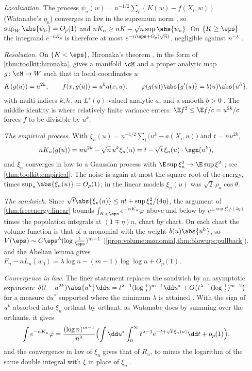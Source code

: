 \begin{refsection}
\begin{proofsketch}
\emph{Localization.} The process $\psi_n(w)=n^{-1/2}\sum_i(K(w)-f(X_i,w))$ (Watanabe's $\eta_n$) converges in law in the supremum norm \parencite[Theorems 5.9 and 5.10, as cited in][]{Watanabe2013}, so $\sup_W\abs{\psi_n}=O_p(1)$ and $nK_n\ge nK-\sqrt n\sup\abs{\psi_n}$. On $\{K\ge\eps\}$ the integrand $e^{-nK_n}$ is therefore at most $e^{-n\eps+O_p(\sqrt n)}$, negligible against $n^{-\lambda}$ \parencite[Lemma~1]{Watanabe2013}.

\emph{Resolution.} On $\{K<\eps\}$, Hironaka's theorem \parencite{Hironaka1964a}, in the form of \cref{thm:toolkit:hironaka}, gives a manifold $\cM$ and a proper analytic map $g\colon\cM\to W$ such that in local coordinates $u$
\[
K(g(u))=u^{2k},\qquad f(x,g(u))=u^ka(x,u),\qquad \varphi(g(u))\abs{g'(u)}=b(u)\abs{u^h},
\]
with multi-indices $k,h$, an $L^s(q)$-valued analytic $a$, and a smooth $b>0$ \parencite[Theorem~1, the standard representation]{Watanabe2013}. The middle identity is where relatively finite variance enters: $\E f^2\le\E f/c=u^{2k}/c$ forces $f$ to be divisible by $u^k$.

\emph{The empirical process.} With $\xi_n(u)=n^{-1/2}\sum_i\bigl(u^k-a(X_i,u)\bigr)$ and $t=nu^{2k}$,
\[
nK_n(g(u))=nu^{2k}-\sqrt n\,u^k\xi_n(u)=t-\sqrt t\,\xi_n(u)\cdot\sgn(u^k),
\]
and $\xi_n$ converges in law to a Gaussian process with $\E\sup\xi_n^2\to\E\sup\xi^2$ \parencite[Theorems 6.1--6.3, as cited in][]{Watanabe2013}; see \cref{thm:toolkit:empirical}. The noise is again at most the square root of the energy, times $\sup_u\abs{\xi_n(u)}=O_p(1)$; in the linear models $\xi_n(u)$ was $\sqrt2\,\rho_n\cos\theta$.

\emph{The sandwich.} Since $\sqrt t\abs{\xi_n(u)}\le\eta t+\sup\xi_n^2/(4\eta)$, the argument of \cref{thm:freeenergy:linear} bounds $\int_{K<\eps}e^{-nK_n}\varphi$ above and below by $e^{\pm\sup\xi_n^2/(4\eta)}$ times the population integrals at $(1\mp\eta)n$, chart by chart. On each chart the volume function is that of a monomial with the weight $b(u)\abs{u^h}$, so $V(\eps)\sim C\eps^\lambda(\log\frac1\eps)^{m-1}$ (\cref{prop:volume:monomial,thm:blowups:pullback}), and the Abelian lemma gives $F_n-nL_n(w_0)=\lambda\log n-(m-1)\log\log n+O_p(1)$.

\emph{Convergence in law.} The finer statement replaces the sandwich by an asymptotic expansion: $\delta(t-u^{2k})\abs{u^h}\dd u=t^{\lambda-1}(\log\frac1t)^{m-1}\dd u^*+O\bigl(t^{\lambda-1}(\log\frac1t)^{m-2}\bigr)$ for a measure $\dd u^*$ supported where the minimum $\lambda$ is attained \parencite[Lemma~4, citing Theorem~4.6 of the 2009 book]{Watanabe2013}. With the sign of $u^k$ absorbed into $\xi_n$ orthant by orthant, as Watanabe does by summing over the orthants, it gives
\[
\int e^{-nK_n}\varphi=\frac{(\log n)^{m-1}}{n^\lambda}\Bigl(\int\dd u^*\int_0^\infty t^{\lambda-1}e^{-t+\sqrt t\,\xi_n(u)}\dd t+o_p(1)\Bigr),
\]
and the convergence in law of $\xi_n$ gives that of $R_n$, to minus the logarithm of the same double integral with $\xi$ in place of $\xi_n$ \parencite[eq.~(52) of the arXiv version]{Watanabe2024}.


\end{proofsketch}
\end{refsection}
